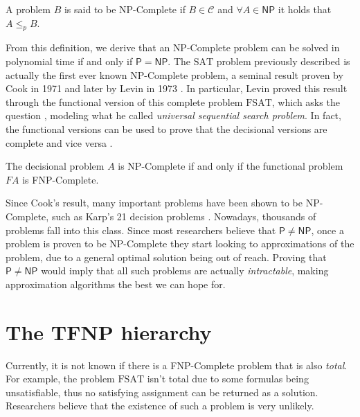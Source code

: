 \begin{definition}
    A problem $B$ is said to be \textsf{NP}-Complete if $B \in \mathcal{C}$ and $\forall A \in \mathsf{NP}$ it holds that $A \leq_p B$.
\end{definition}

From this definition, we derive that an \textsf{NP}-Complete problem can be solved in polynomial time if and only if $\mathsf{P} = \mathsf{NP}$. The $\mathrm{SAT}$ problem previously described is actually the first ever known \textsf{NP}-Complete problem, a seminal result proven by Cook in 1971 \cite{cook_sat} and later by Levin in 1973 \cite{levin_fsat}. In particular, Levin proved this result through the functional version of this complete problem $\mathrm{FSAT}$, which asks the question , modeling what he called \textit{universal sequential search problem}. In fact, the functional versions can be used to prove that the decisional versions are complete and vice versa \cite{rel_comp_np_search}.

\begin{theorem}
 The decisional problem $A$ is \textsf{NP}-Complete if and only if the functional problem $FA$ is \textsf{FNP}-Complete.
\end{theorem}

Since Cook's result, many important problems have been shown to be \textsf{NP}-Complete, such as Karp's 21 decision problems \cite{karp}. Nowadays, thousands of problems fall into this class. Since most researchers believe that $\mathsf{P} \neq \mathsf{NP}$, once a problem is proven to be \textsf{NP}-Complete they start looking to approximations of the problem, due to a general optimal solution being out of reach. Proving that $\mathsf{P} \neq \mathsf{NP}$ would imply that all such problems are actually \textit{intractable}, making approximation algorithms the best we can hope for.

\section{The \textsf{TFNP} hierarchy}

Currently, it is not known if there is a \textsf{FNP}-Complete problem that is also \textit{total}. For example, the problem $\mathrm{FSAT}$ isn't total due to some formulas being unsatisfiable, thus no satisfying assignment can be returned as a solution. Researchers believe that the existence of such a problem is very unlikely. 

